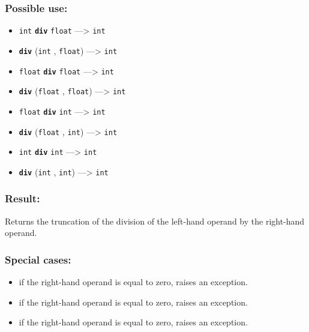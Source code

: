 \documentclass[]{book}
\providecommand{\tightlist}{%
  \setlength{\itemsep}{0pt}\setlength{\parskip}{0pt}}
\theoremstyle{definition}
\theoremstyle{definition}
\theoremstyle{definition}
\theoremstyle{remark}
\begin{document}
\subsubsection{Possible use:}\label{possible-use-140}

\begin{itemize}
\tightlist
\item
  \texttt{int} \textbf{\texttt{div}} \texttt{float} ---\textgreater{}
  \texttt{int}
\item
  \textbf{\texttt{div}} (\texttt{int} , \texttt{float})
  ---\textgreater{} \texttt{int}
\item
  \texttt{float} \textbf{\texttt{div}} \texttt{float} ---\textgreater{}
  \texttt{int}
\item
  \textbf{\texttt{div}} (\texttt{float} , \texttt{float})
  ---\textgreater{} \texttt{int}
\item
  \texttt{float} \textbf{\texttt{div}} \texttt{int} ---\textgreater{}
  \texttt{int}
\item
  \textbf{\texttt{div}} (\texttt{float} , \texttt{int})
  ---\textgreater{} \texttt{int}
\item
  \texttt{int} \textbf{\texttt{div}} \texttt{int} ---\textgreater{}
  \texttt{int}
\item
  \textbf{\texttt{div}} (\texttt{int} , \texttt{int}) ---\textgreater{}
  \texttt{int}
\end{itemize}

\subsubsection{Result:}\label{result-136}

Returns the truncation of the division of the left-hand operand by the
right-hand operand.

\subsubsection{Special cases:}\label{special-cases-52}

\begin{itemize}
\tightlist
\item
  if the right-hand operand is equal to zero, raises an exception.\\
\item
  if the right-hand operand is equal to zero, raises an exception.\\
\item
  if the right-hand operand is equal to zero, raises an exception.
\end{itemize}
\end{document}
